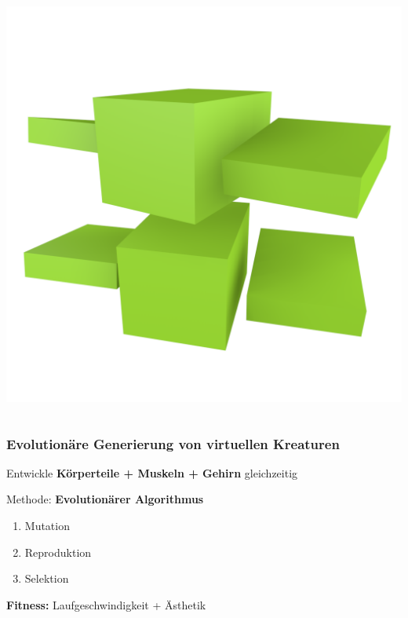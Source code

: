 \documentclass{beamer}
\begin{document}
\begin{frame}
\begin{columns}
		\includegraphics[width=\textwidth]{img/6.png}
	\end{columns}
\end{frame}

\begin{frame}
	\frametitle{Evolutionäre Generierung von virtuellen Kreaturen}
	Entwickle \textbf{Körperteile + Muskeln + Gehirn} gleichzeitig\\ \pause
	\vspace{2em}
	
	Methode: \textbf{Evolutionärer Algorithmus} \pause
	\begin{enumerate}
		\item Mutation
		\item Reproduktion
		\item Selektion
	\end{enumerate}
	\pause
	\vspace{2em}
	\textbf{Fitness:} Laufgeschwindigkeit \pause  + Ästhetik
\end{frame}
\end{document}
